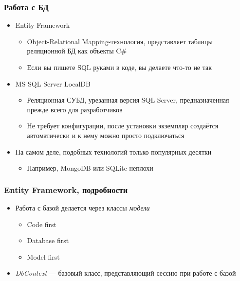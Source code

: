 \documentclass[xetex,mathserif,serif]{beamer}
\begin{document}
	\begin{frame}
		\frametitle{Работа с БД}
		\begin{itemize}
			\item Entity Framework
			\begin{itemize}
				\item Object-Relational Mapping-технология, представляет таблицы реляционной БД как объекты C\#
				\item Если вы пишете SQL руками в коде, вы делаете что-то не так
			\end{itemize}
			\item MS SQL Server LocalDB
			\begin{itemize}
				\item Реляционная СУБД, урезанная версия SQL Server, предназначенная прежде всего для разработчиков
				\item Не требует конфигурации, после установки экземпляр создаётся автоматически и к нему можно просто подключаться
			\end{itemize}
			\item На самом деле, подобных технологий только популярных десятки
			\begin{itemize}
				\item Например, MongoDB или SQLite неплохи
			\end{itemize}
		\end{itemize}
	\end{frame}

	\begin{frame}
		\frametitle{Entity Framework, подробности}
		\begin{itemize}
			\item Работа с базой делается через классы \textit{модели}
			\begin{itemize}
				\item Code first
				\item Database first
				\item Model first
			\end{itemize}
			\item \textit{DbContext} --- базовый класс, представляющий сессию при работе с базой
		\end{itemize}
	\end{frame}
\end{document}
